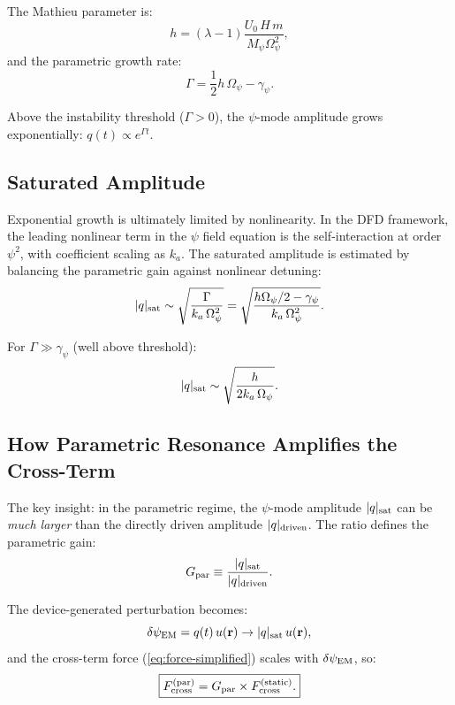 \documentclass[11pt]{article}
\newcommand{\ka}{k_a}
\begin{document}
The Mathieu parameter is:
\begin{equation}
h = (\lambda - 1)\frac{U_0\,H\,m}{M_\psi\Omega_\psi^2},
\end{equation}
and the parametric growth rate:
\begin{equation}\label{eq:growth-rate}
\Gamma = \frac{1}{2}h\,\Omega_\psi - \gamma_\psi.
\end{equation}

Above the instability threshold ($\Gamma > 0$), the $\psi$-mode amplitude
grows exponentially: $q(t) \propto e^{\Gamma t}$.

\subsection{Saturated Amplitude}

Exponential growth is ultimately limited by nonlinearity. In the DFD
framework, the leading nonlinear term in the $\psi$ field equation is the
self-interaction at order $\psi^2$, with coefficient scaling as $\ka$.
The saturated amplitude is estimated by balancing the parametric gain
against nonlinear detuning:
\begin{equation}\label{eq:saturated-q}
|q|_{\rm sat} \sim \sqrt{\frac{\Gamma}{\ka\,\Omega_\psi^2}}
  = \sqrt{\frac{h\Omega_\psi/2 - \gamma_\psi}{\ka\,\Omega_\psi^2}}.
\end{equation}

For $\Gamma \gg \gamma_\psi$ (well above threshold):
\begin{equation}
|q|_{\rm sat} \sim \sqrt{\frac{h}{2\ka\,\Omega_\psi}}.
\end{equation}

\subsection{How Parametric Resonance Amplifies the Cross-Term}

The key insight: in the parametric regime, the $\psi$-mode amplitude
$|q|_{\rm sat}$ can be \textit{much larger} than the directly driven
amplitude $|q|_{\rm driven}$. The ratio defines the parametric gain:
\begin{equation}\label{eq:par-gain}
G_{\rm par} \equiv \frac{|q|_{\rm sat}}{|q|_{\rm driven}}.
\end{equation}

The device-generated perturbation becomes:
\begin{equation}
\delta\psi_{\rm EM} = q(t)\,u(\mathbf{r}) \to |q|_{\rm sat}\,u(\mathbf{r}),
\end{equation}
and the cross-term force (\ref{eq:force-simplified}) scales with
$\delta\psi_{\rm EM}$, so:
\begin{equation}\label{eq:amplified-force}
\boxed{
F_{\rm cross}^{(\rm par)} = G_{\rm par} \times F_{\rm cross}^{(\rm static)}.
}
\end{equation}
\end{document}
